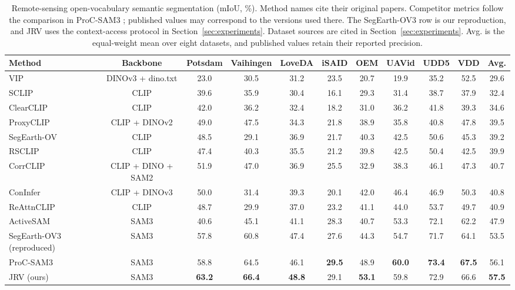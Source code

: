 \clearpage
\begin{table}[t]
\centering
\captionsetup{hypcap=false}
\caption{Remote-sensing open-vocabulary semantic segmentation (mIoU, \%). Method names cite their original papers. Competitor metrics follow the comparison in ProC-SAM3 \cite{R12}; published values may correspond to the versions used there. The SegEarth-OV3 row is our reproduction, and JRV uses the context-access protocol in Section~\ref{sec:experiments}. Dataset sources are cited in Section~\ref{sec:experiments}. Avg. is the equal-weight mean over eight datasets, and published values retain their reported precision.}
\captionsetup{hypcap=true}
\label{tab:main-comparison}
\setlength{\tabcolsep}{3pt}
\scriptsize
\begin{tabular}{lcccccccccc}
\toprule
Method & Backbone & Potsdam & Vaihingen & LoveDA & iSAID & OEM & UAVid & UDD5 & VDD & Avg. \\
\midrule
VIP~\cite{R32} & DINOv3 + dino.txt & 23.0 & 30.5 & 31.2 & 23.5 & 20.7 & 19.9 & 35.2 & 52.5 & 29.6 \\
SCLIP~\cite{R29} & CLIP & 39.6 & 35.9 & 30.4 & 16.1 & 29.3 & 31.4 & 38.7 & 37.9 & 32.4 \\
ClearCLIP~\cite{R30} & CLIP & 42.0 & 36.2 & 32.4 & 18.2 & 31.0 & 36.2 & 41.8 & 39.3 & 34.6 \\
ProxyCLIP~\cite{R31} & CLIP + DINOv2 & 49.0 & 47.5 & 34.3 & 21.8 & 38.9 & 35.8 & 40.8 & 47.8 & 39.5 \\
SegEarth-OV~\cite{R06} & CLIP & 48.5 & 29.1 & 36.9 & 21.7 & 40.3 & 42.5 & 50.6 & 45.3 & 39.2 \\
RSCLIP~\cite{R33} & CLIP & 47.4 & 40.3 & 35.5 & 21.2 & 39.8 & 42.5 & 50.4 & 42.5 & 39.9 \\
CorrCLIP~\cite{R34} & CLIP + DINO + SAM2 & 51.9 & 47.0 & 36.9 & 25.5 & 32.9 & 38.3 & 46.1 & 47.3 & 40.7 \\
ConInfer~\cite{R26} & CLIP + DINOv3 & 50.0 & 31.4 & 39.3 & 20.1 & 42.0 & 46.4 & 46.9 & 50.3 & 40.8 \\
ReAttnCLIP~\cite{R07} & CLIP & 48.7 & 29.9 & 37.0 & 23.2 & 41.1 & 44.0 & 53.7 & 49.7 & 40.9 \\
ActiveSAM~\cite{R35} & SAM3 & 40.6 & 45.1 & 41.1 & 28.3 & 40.7 & 53.3 & 72.1 & 62.2 & 47.9 \\
SegEarth-OV3 (reproduced)~\cite{R11} & SAM3 & 57.8 & 60.8 & 47.4 & 27.6 & 44.3 & 54.7 & 71.7 & 64.1 & 53.5 \\
ProC-SAM3~\cite{R12} & SAM3 & 58.8 & 64.5 & 46.1 & \textbf{29.5} & 48.9 & \textbf{60.0} & \textbf{73.4} & \textbf{67.5} & 56.1 \\
JRV (ours) & SAM3 & \textbf{63.2} & \textbf{66.4} & \textbf{48.8} & 29.1 & \textbf{53.1} & 59.8 & 72.9 & 66.6 & \textbf{57.5} \\
\bottomrule
\end{tabular}
\end{table}

